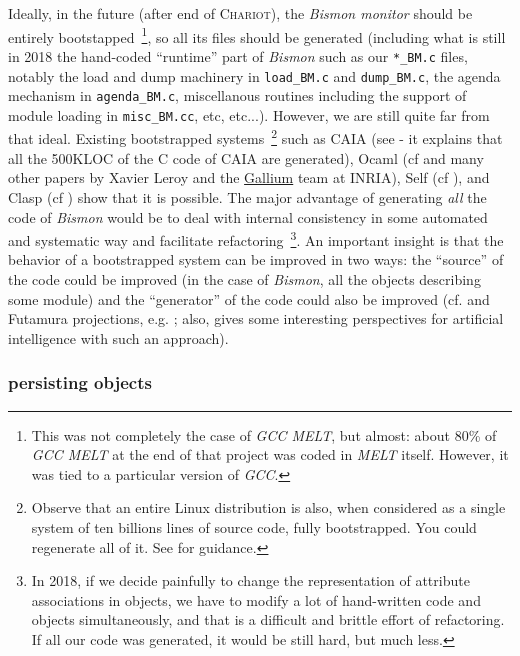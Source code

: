 Ideally, in the future (after end of \textsc{Chariot}), the
\emph{Bismon monitor} should be entirely bootstapped~\footnote{This
  was not completely the case of \emph{GCC MELT}, but almost: about
  80\% of \emph{GCC MELT} at the end of that project was coded in
  \emph{MELT} itself. However, it was tied to a particular version of
  \emph{GCC}.}, so all its files should be generated (including what
is still in 2018 the hand-coded ``runtime'' part of \emph{Bismon} such
as our \texttt{*\_BM.c} files, notably the load and dump machinery in
\texttt{load\_BM.c} and \texttt{dump\_BM.c}, the agenda mechanism in
\texttt{agenda\_BM.c}, miscellanous routines including the support of
module loading in \texttt{misc\_BM.cc}, etc, etc...). However, we are
still quite far from that ideal. Existing
bootstrapped  systems~\footnote{Observe that an entire Linux
  distribution is also, when considered as a single system of ten
  billions lines of source code, fully bootstrapped. You could
  regenerate all of it. See 
  for guidance.} such as CAIA {\small (see \cite{Pitrat:blog} - it
  explains that all the 500KLOC of the C code of CAIA are generated)},
Ocaml {\small (cf \cite{Ocaml, Leroy-modular-modules} and many other
  papers by Xavier Leroy and the
  \href{http://gallium.inria.fr/}{Gallium} team at INRIA)}, Self
{\small (cf \cite{Ungar:1987:Self})}, and Clasp {\small (cf
  \cite{Schafmeister:2015:CLASP})} show that it is possible. The major
advantage of generating \emph{all} the code of \emph{Bismon} would be
to deal with internal consistency in some automated and systematic way
and facilitate refactoring~\footnote{In 2018, if we decide painfully
  to change the representation of attribute associations in objects,
  we have to modify a lot of hand-written code and objects
  simultaneously, and that is a difficult and brittle effort of
  refactoring. If all our code was generated, it would be still hard,
  but much less.}. An important insight is that the behavior of a
bootstrapped  system can be improved in two ways: the ``source'' of the
code could be improved (in the case of \emph{Bismon}, all the objects
describing some module) and the ``generator'' of the code could also
be improved (cf.  and
Futamura projections, e.g. \cite{Futamura:1999:PartialEval}; also,
\cite{Pitrat:2009:ArtifBeings, Pitrat:blog} gives some interesting
perspectives for artificial intelligence with such an approach).

\subsubsection{persisting objects}
\label{subsubsec:persistobj}


